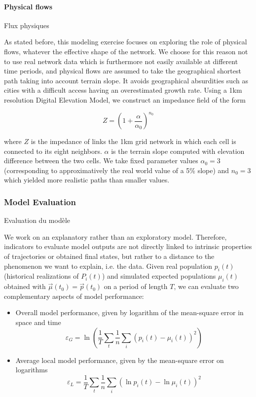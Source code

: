 \paragraph{Physical flows}{Flux physiques}

As stated before, this modeling exercise focuses on exploring the role of physical flows, whatever the effective shape of the network. We choose for this reason not to use real network data which is furthermore not easily available at different time periods, and physical flows are assumed to take the geographical shortest path taking into account terrain slope. It avoids geographical absurdities such as cities with a difficult access having an overestimated growth rate. Using a 1km resolution Digital Elevation Model, we construct an impedance field of the form

\[
Z = \left(1 + \frac{\alpha}{\alpha_0}\right)^{n_0}
\]

where $Z$ is the impedance of links the 1km grid network in which each cell is connected to its eight neighbors. $\alpha$ is the terrain slope computed with elevation difference between the two cells. We take fixed parameter values $\alpha_0 = 3$ (corresponding to approximatively the real world value of a 5\% slope) and $n_0 = 3$ which yielded more realistic paths than smaller values.



\subsubsection{Model Evaluation}{Evaluation du modèle}

We work on an explanatory rather than an exploratory model. Therefore, indicators to evaluate model outputs are not directly linked to intrinsic properties of trajectories or obtained final states, but rather to a distance to the phenomenon we want to explain, i.e. the data. Given real population $p_i(t)$ (historical realizations of $P_i(t)$) and simulated expected populations $\mu_i(t)$ obtained with $\vec{\mu}(t_0) = \vec{p}(t_0)$ on a period of length $T$, we can evaluate two complementary aspects of model performance:

\begin{itemize}
\item Overall model performance, given by logarithm of the mean-square error in space and time
\[
\varepsilon_G = \ln{\left(\frac{1}{T}\sum_t \frac{1}{n} \sum_i \left(p_i (t) - \mu_i (t) \right)^2\right)}
\]
\item Average local model performance, given by the mean-square error on logarithms
\[
\varepsilon_L = \frac{1}{T}\sum_t \frac{1}{n} \sum_i \left(\ln p_i(t) - \ln \mu_i (t)\right)^2
\]
\end{itemize}

